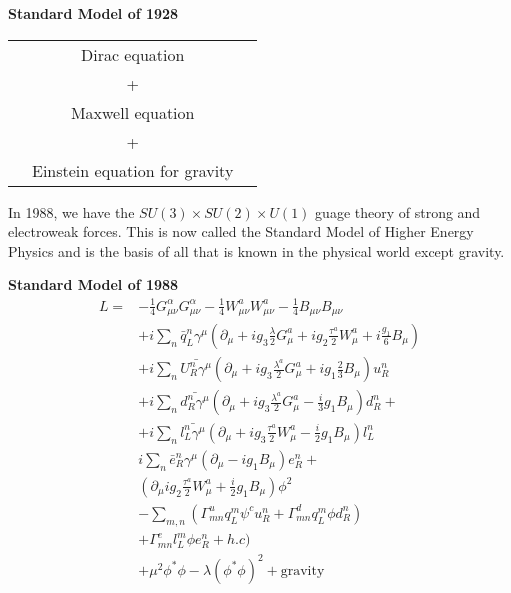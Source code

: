 \textbf{Standard Model of 1928}

\begin{center}
\begin{tabular}{|ccc|}
\hline
& Dirac equation&\\
					&+&\\
				&Maxwell equation&\\
					&+&\\
				&Einstein equation for gravity&\\
\hline
\end{tabular}
\end{center}
	
In 1988, we have the $SU(3) \times SU(2)\times  U(1)$ guage theory of strong and electroweak forces. This is now called the Standard Model of Higher Energy Physics and is the basis of all that is known in the physical world except gravity.

\textbf{Standard Model of 1988}
\begin{align*}
L =& -\frac{1}{4} G^{\alpha}_{\mu \nu} G^{\alpha}_{\mu \nu} - \frac{1}{4} W_{\mu \nu}^{a} W_{\mu \nu}^{a} - \frac{1}{4} B_{\mu \nu} B_{\mu \nu}\\
& + i \sum_{n} \bar{q}_{L}^{n} \gamma^{\mu}(\partial_{\mu} + i g_{3} \frac{\lambda}{2} G_{\mu}^{a} + i g_{2} \frac{\tau^{a}}{2} W_{\mu}^{a} + i \frac{g_{1}}{6}B_{\mu})\\
& + i \sum_{n} \bar{U_{R}^{n} \gamma^{\mu}} (\partial_{\mu} + ig_{3} \frac{\lambda^{a}}{2} G_{\mu}^{a} + ig_{1}\frac{2}{3}B_{\mu}) u_{R}^{n}\\
& + i \sum_{n} \bar{d_{R}^{n} \gamma^{\mu}} (\partial_{\mu} + ig_{3} \frac{\lambda^{a}}{2} G_{\mu}^{a} - \frac{i}{3}g_{1}B_{\mu}) d_{R}^{n}+\\
& + i \sum_{n} \bar{l_{L}^{n} \gamma^{\mu}} (\partial_{\mu} + ig_{3} \frac{\tau^{a}}{2} W_{\mu}^{a} - \frac{i}{2}g_{1}B_{\mu}) l_{L}^{n}\\
& i \sum_{n} \bar{e}_{R}^{n} \gamma^{\mu}(\partial_{\mu} - i g_{1}B_{\mu}) e^{n}_{R} +\\
& (\partial_{\mu} ig_{2} \frac{\tau^{a}}{2} W_{\mu}^{a} + \frac{i}{2} g_{1} B_{\mu}) \phi^{2}\\
&- \sum\limits_{m,n} (\Gamma^{u}_{mn} q_{L}^{m} \psi^{c}u_{R}^{n} + \Gamma^{d}_{mn} q_{L}^{m} \phi d_{R}^{n})\\
& + \Gamma_{mn}^{e} l_{L}^{m} \phi e_{R}^{n} + h.c)\\
& + \mu^{2}\phi^{*} \phi - \lambda(\phi^{*} \phi)^{2} + \text{gravity}
\end{align*}



